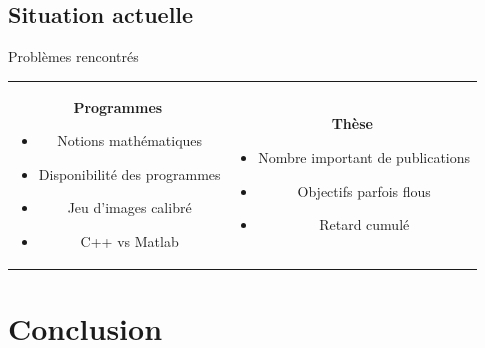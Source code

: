\documentclass{beamer}
\begin{document}
\subsection*{Situation actuelle}
\begin{frame}{Problèmes rencontrés}

  \begin{tabular}{c | c}
    \begin{minipage}{0.5\linewidth}
      \begin{center}
        \begin{Large}
          \textbf{Programmes}
        \end{Large}
      \end{center}
      \begin{itemize}
      \item Notions mathématiques
      \item Disponibilité des programmes
      \item Jeu d'images calibré
      \item C++ vs Matlab
      \end{itemize}
    \end{minipage}
    &
    \begin{minipage}{0.5\linewidth}
      \begin{center}
        \begin{Large}
          \textbf{Thèse}
        \end{Large}
      \end{center}
      \begin{itemize}
      \item Nombre important de publications
      \item Objectifs parfois flous
      \item Retard cumulé
      \end{itemize}
    \end{minipage}
  \end{tabular}
\end{frame}


\section{Conclusion}
\end{document}
